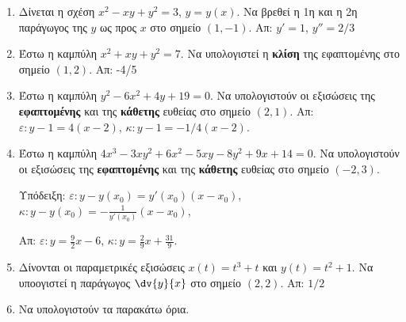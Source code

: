 \begin{enumerate}
  \item Δίνεται η σχέση $ x^{2} - xy + y^{2} = 3 $, $ y=y(x) $. Να βρεθεί η 1η
    και η 2η παράγωγος της $y$ ως προς $x$ στο σημείο $ (1,-1) $.
    \hfill Απ: $ y' = 1$, $ y'' = 2/3 $

  \item Έστω η καμπύλη $ x^{2} + xy + y^{2} = 7 $. Να υπολογιστεί η \textbf{κλίση} της 
    εφαπτομένης στο σημείο $ (1,2) $.
    \hfill Απ: -4/5 

  \item Έστω η καμπύλη $ y^{2}-6x^2 + 4y + 19 = 0 $. Να υπολογιστούν οι εξισώσεις της
    \textbf{εφαπτομένης} και της \textbf{κάθετης} ευθείας στο σημείο  $ (2,1) $.
    \hfill Απ: $\varepsilon\colon y - 1 = 4 (x-2) $, 
    $\kappa\colon y - 1 = -1/4 (x-2) $.

  \item Έστω η καμπύλη $ 4x^{3} - 3xy^{2} + 6x^{2} - 5xy - 8 y^{2} + 9x + 14 = 0$. 
    Να υπολογιστούν οι εξισώσεις της \textbf{εφαπτομένης} και της \textbf{κάθετης} 
    ευθείας στο σημείο  $ (-2,3) $.

    \textcolor{Col1}{Υπόδειξη:} 
    $ \varepsilon: y-y(x_{0}) = y'(x_{0})(x- x_{0}) $, \;
    $ \kappa: y-y(x_{0}) = -\frac{1}{y'(x_{0})}(x- x_{0}) $, \;

    \hfill Απ: $\varepsilon\colon y = \frac{9}{2} x - 6 $, 
    $\kappa\colon y = \frac{2}{9} x + \frac{31}{9} $.

  \item Δίνονται οι παραμετρικές εξισώσεις $ x(t)=t^{3}+t $ και $ y(t)=t^{2}+1 $. 
    Να υποογιστεί η παράγωγος $ \dv{y}{x} $ στο σημείο $ (2,2) $.
    \hfill Απ: $ 1/2 $

  \item Να υπολογιστούν τα παρακάτω όρια.
    \begin{enumerate}[i)]
    \end{enumerate}
\end{enumerate}





